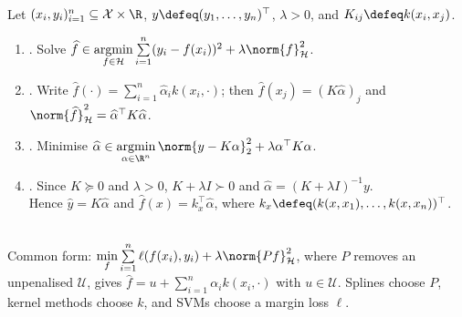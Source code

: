\begin{method} \label{meth:sl-kernel-ridge-regression} \\
Let $(x_i,y_i)_{i=1}^n\subseteq\mathcal{X}\times\R$, $y\defeq(y_1,\ldots,y_n)^\top$, $\lambda>0$, and $K_{ij}\defeq k(x_i,x_j)$.
\begin{enumerate}[label=(\roman*)]
\setlength{\itemsep}{0pt}
\item {}. Solve $\widehat{f}\in\operatorname*{argmin}\limits_{f\in\mathcal{H}}\sum\limits_{i=1}^n(y_i-f(x_i))^2+\lambda\norm{f}_{\mathcal{H}}^2$.
\item {}. Write $\widehat{f}(\cdot)=\sum\limits_{i=1}^n\widehat{\alpha}_ik(x_i,\cdot)$; then $\widehat{f}(x_j)=(K\widehat{\alpha})_j$ and $\norm{\widehat{f}}_{\mathcal{H}}^2=\widehat{\alpha}^\top K\widehat{\alpha}$.
\item {}. Minimise $\widehat{\alpha}\in\operatorname*{argmin}\limits_{\alpha\in\R^n}\norm{y-K\alpha}_2^2+\lambda\alpha^\top K\alpha$.
\item {}. Since $K\succeq0$ and $\lambda>0$, $K+\lambda I\succ0$ and $\widehat{\alpha}=(K+\lambda I)^{-1}y$.\\
Hence $\widehat{y}=K\widehat{\alpha}$ and $\widehat{f}(x)=k_x^\top\widehat{\alpha}$, where $k_x\defeq(k(x,x_1),\ldots,k(x,x_n))^\top$.
\end{enumerate}
\end{method}

\begin{remark} \label{rem:sl-rkhs-regularization-spline-kernel-link} \\
Common form: $\min\limits_f\sum\limits_{i=1}^n\ell(f(x_i),y_i)+\lambda\norm{Pf}_{\mathcal{H}}^2$, where $P$ removes an unpenalised $\mathcal{U}$, gives $\widehat{f}=u+\sum\limits_{i=1}^n\alpha_i k(x_i,\cdot)$ with $u\in\mathcal{U}$. Splines choose $P$, kernel methods choose $k$, and SVMs choose a margin loss $\ell$.
\end{remark}
